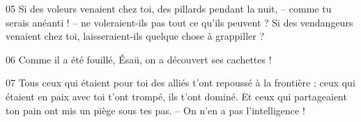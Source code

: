 
05 Si des voleurs venaient chez toi, des pillards pendant la nuit, – comme tu serais anéanti ! –  ne voleraient-ils pas tout ce qu’ils peuvent ? Si des vendangeurs venaient chez toi, laisseraient-ils quelque chose à grappiller ?

06 Comme il a été fouillé, Ésaü, on a découvert ses cachettes !

07 Tous ceux qui étaient pour toi des alliés t’ont repoussé à la frontière ; ceux qui étaient en paix avec toi t’ont trompé, ils t’ont dominé. Et ceux qui partageaient ton pain ont mis un piège sous tes pas. – On n’en a pas l’intelligence !

